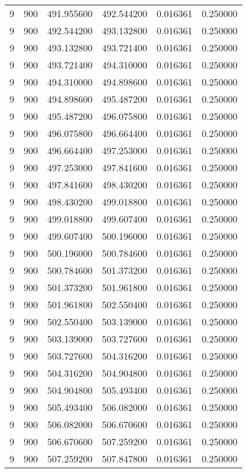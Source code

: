 \begin{longtable}{rrrrrr}
9 & 900 & 491.955600 & 492.544200 & 0.016361 & 0.250000 \\
9 & 900 & 492.544200 & 493.132800 & 0.016361 & 0.250000 \\
9 & 900 & 493.132800 & 493.721400 & 0.016361 & 0.250000 \\
9 & 900 & 493.721400 & 494.310000 & 0.016361 & 0.250000 \\
9 & 900 & 494.310000 & 494.898600 & 0.016361 & 0.250000 \\
9 & 900 & 494.898600 & 495.487200 & 0.016361 & 0.250000 \\
9 & 900 & 495.487200 & 496.075800 & 0.016361 & 0.250000 \\
9 & 900 & 496.075800 & 496.664400 & 0.016361 & 0.250000 \\
9 & 900 & 496.664400 & 497.253000 & 0.016361 & 0.250000 \\
9 & 900 & 497.253000 & 497.841600 & 0.016361 & 0.250000 \\
9 & 900 & 497.841600 & 498.430200 & 0.016361 & 0.250000 \\
9 & 900 & 498.430200 & 499.018800 & 0.016361 & 0.250000 \\
9 & 900 & 499.018800 & 499.607400 & 0.016361 & 0.250000 \\
9 & 900 & 499.607400 & 500.196000 & 0.016361 & 0.250000 \\
9 & 900 & 500.196000 & 500.784600 & 0.016361 & 0.250000 \\
9 & 900 & 500.784600 & 501.373200 & 0.016361 & 0.250000 \\
9 & 900 & 501.373200 & 501.961800 & 0.016361 & 0.250000 \\
9 & 900 & 501.961800 & 502.550400 & 0.016361 & 0.250000 \\
9 & 900 & 502.550400 & 503.139000 & 0.016361 & 0.250000 \\
9 & 900 & 503.139000 & 503.727600 & 0.016361 & 0.250000 \\
9 & 900 & 503.727600 & 504.316200 & 0.016361 & 0.250000 \\
9 & 900 & 504.316200 & 504.904800 & 0.016361 & 0.250000 \\
9 & 900 & 504.904800 & 505.493400 & 0.016361 & 0.250000 \\
9 & 900 & 505.493400 & 506.082000 & 0.016361 & 0.250000 \\
9 & 900 & 506.082000 & 506.670600 & 0.016361 & 0.250000 \\
9 & 900 & 506.670600 & 507.259200 & 0.016361 & 0.250000 \\
9 & 900 & 507.259200 & 507.847800 & 0.016361 & 0.250000 \\

\end{longtable}
